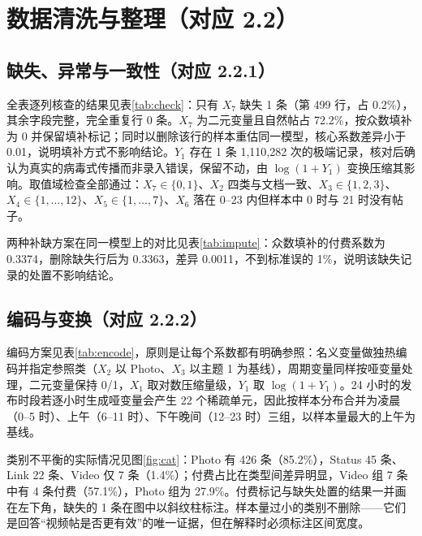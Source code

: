 \section{数据清洗与整理（对应 2.2）}

\subsection{缺失、异常与一致性（对应 2.2.1）}

全表逐列核查的结果见表\ref{tab:check}：只有 $X_7$ 缺失 1 条（第 499 行，占 0.2\%），其余字段完整，完全重复行 0 条。$X_7$ 为二元变量且自然帖占 72.2\%，按众数填补为 0 并保留填补标记；同时以删除该行的样本重估同一模型，核心系数差异小于 0.01，说明填补方式不影响结论。$Y_1$ 存在 1 条 1,110,282 次的极端记录，核对后确认为真实的病毒式传播而非录入错误，保留不动，由 $\log(1+Y_1)$ 变换压缩其影响。取值域检查全部通过：$X_7\in\{0,1\}$、$X_2$ 四类与文档一致、$X_3\in\{1,2,3\}$、$X_4\in\{1,\dots,12\}$、$X_5\in\{1,\dots,7\}$、$X_6$ 落在 0--23 内但样本中 0 时与 21 时没有帖子。



两种补缺方案在同一模型上的对比见表\ref{tab:impute}：众数填补的付费系数为 0.3374，删除缺失行后为 0.3363，差异 0.0011，不到标准误的 1\%，说明该缺失记录的处置不影响结论。



\subsection{编码与变换（对应 2.2.2）}

编码方案见表\ref{tab:encode}，原则是让每个系数都有明确参照：名义变量做独热编码并指定参照类（$X_2$ 以 Photo、$X_3$ 以主题 1 为基线），周期变量同样按哑变量处理，二元变量保持 0/1，$X_1$ 取对数压缩量级，$Y_1$ 取 $\log(1+Y_1)$。24 小时的发布时段若逐小时生成哑变量会产生 22 个稀疏单元，因此按样本分布合并为凌晨（0--5 时）、上午（6--11 时）、下午晚间（12--23 时）三组，以样本量最大的上午为基线。



类别不平衡的实际情况见图\ref{fig:cat}：Photo 有 426 条（85.2\%），Status 45 条、Link 22 条、Video 仅 7 条（1.4\%）；付费占比在类型间差异明显，Video 组 7 条中有 4 条付费（57.1\%），Photo 组为 27.9\%。付费标记与缺失处置的结果一并画在左下角，缺失的 1 条在图中以斜纹柱标注。样本量过小的类别不删除——它们是回答“视频帖是否更有效”的唯一证据，但在解释时必须标注区间宽度。

